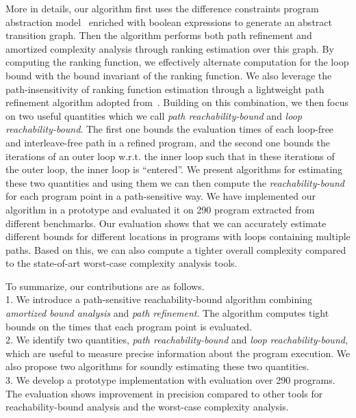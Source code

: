 More in details, our algorithm first uses the difference constraints program abstraction model~\cite{SinnZV17,SinnZV14} enriched with boolean expressions to generate an abstract transition graph.
Then the algorithm performs both path refinement and amortized complexity analysis through ranking estimation over this graph.
By computing the ranking function, we effectively alternate computation for the loop bound with the bound invariant of the ranking function. 
We also leverage the path-insensitivity of ranking function estimation through a lightweight path refinement algorithm adopted from~\cite{GulwaniJK09}.
Building on this combination, we then focus on two useful quantities which we call \emph{path reachability-bound} and \emph{loop reachability-bound}.
The first one bounds the evaluation times of each loop-free and interleave-free path in a refined program, and the second one bounds the iterations of an outer loop w.r.t. the inner loop such that in these iterations of the outer loop, the inner loop is ``entered''. 
We present algorithms for estimating these two quantities and using them we can then 
compute the \emph{reachability-bound} for each program point in a path-sensitive way.
We have implemented our algorithm in a prototype and evaluated it on 290 program extracted from different benchmarks. Our evaluation %
shows that we can accurately estimate different bounds for different locations in programs with loops containing multiple paths. Based on this, we can also compute a tighter overall complexity compared to the state-of-art worst-case complexity analysis tools.

To summarize, our contributions are as follows.
\\
1. We introduce a path-sensitive reachability-bound algorithm 
combining \emph{amortized bound analysis}  and \emph{path refinement}. The algorithm computes tight bounds on the times that each program point is evaluated.
\\
2. We identify two quantities,  \emph{path reachability-bound} and \emph{loop reachability-bound}, which are useful to measure precise information about the program execution.  We also propose two algorithms for soundly estimating these two quantities.
\\
3. We develop a prototype implementation with evaluation over 290 programs.
 The evaluation shows improvement in precision compared to other tools for reachability-bound analysis and the worst-case complexity analysis.

